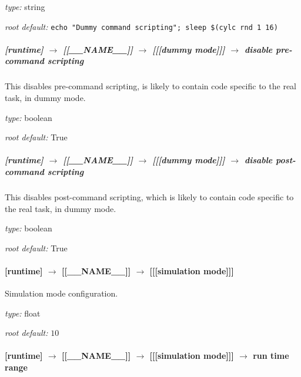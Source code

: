 \begin{myitemize}
\item {\em type:} string
\item {\em root default:} \lstinline=echo "Dummy command scripting"; sleep $(cylc rnd 1 16)=
\end{myitemize}

\subparagraph[disable pre-command scripting]{[runtime] $\rightarrow$ [[\_\_NAME\_\_]] $\rightarrow$ [[[dummy mode]]] $\rightarrow$ disable pre-command scripting}

This disables pre-command scripting, is likely to contain code specific
to the real task, in dummy mode. 

\begin{myitemize}
\item {\em type:} boolean
\item {\em root default:} True
\end{myitemize}

\subparagraph[disable post-command scripting]{[runtime] $\rightarrow$ [[\_\_NAME\_\_]] $\rightarrow$ [[[dummy mode]]] $\rightarrow$ disable post-command scripting}

This disables post-command scripting, which is likely to contain code
specific to the real task, in dummy mode. 

\begin{myitemize}
\item {\em type:} boolean
\item {\em root default:} True
\end{myitemize}

\paragraph[{[[[}simulation mode{]]]}]{[runtime] $\rightarrow$ [[\_\_NAME\_\_]] $\rightarrow$ [[[simulation mode]]]}

Simulation mode configuration.

\begin{myitemize}
\item {\em type:} float
\item {\em root default:} $10$
\end{myitemize}

\paragraph[run time range]{[runtime] $\rightarrow$ [[\_\_NAME\_\_]] $\rightarrow$ [[[simulation mode]]] $\rightarrow$ run time range}

